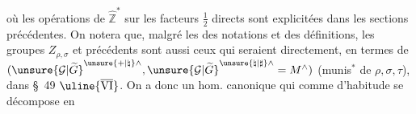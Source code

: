 où les opérations de $\widehat{\mathbb Z}^{*}$ sur les
 facteurs
$\frac12$ directs sont explicitées dans les sections précédentes.
On notera que, malgré les  des
notations et des définitions, les groupes 
$Z_{\rho,\sigma}$ et précédents sont aussi ceux qui seraient
 
directement, en termes de
$(\unsure{\mathcal G|\widetilde G}^{\unsure{+|\natural}\wedge},
\unsure{\mathcal G|\widetilde G}^{\unsure{\natural|\sharp}\wedge}
=M^{\wedge})$
(munis$^{*}$ de $\rho,\sigma,\tau$), dans \S\ 49 $\uline{\overline{\mathrm{VI}}}$.
On a donc un hom. canonique
\diagram{\[
(217)\qquad
\left\{\begin{gathered}
\begin{tikzcd}[ampersand replacement=\&,column sep=5em,row sep=2.5em]
M=\unsure{N|\mathcal N}_{1,1}^{\text{ét}}
\arrow[r]\arrow[d,phantom,"\cup" description]
\& M_{\rho,\sigma}^{\sim}\arrow[d,phantom,"\cup" description]
\\
M^{!}\arrow[r] \& M_{\rho,\sigma}^{\sim\unsure{\natural|\sharp}}
\end{tikzcd}
\end{gathered}\right.
\]}
qui comme d'habitude se décompose en
